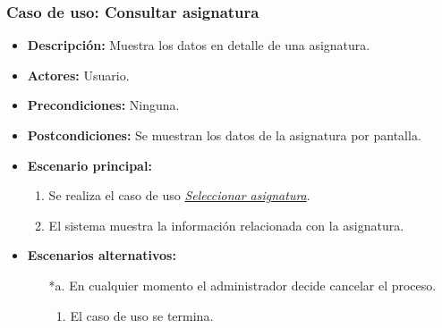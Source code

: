 \documentclass{book}
\begin{document}
\subsubsection*{Caso de uso: Consultar asignatura}
\begin{itemize}
\item{\bf Descripción:} Muestra los datos en detalle de una asignatura.
\item{\bf Actores:} Usuario.
\item{\bf Precondiciones:} Ninguna.
\item{\bf Postcondiciones:} Se muestran los datos de la asignatura por pantalla.
\item{\bf Escenario principal:} 
	\begin{enumerate}
	\item Se realiza el caso de uso {\em \hyperref[select_asignatura]{Seleccionar asignatura}}.
	\item El sistema muestra la información relacionada con la asignatura.
	\end{enumerate}
\item{\bf Escenarios alternativos:}
	\begin{itemize}
	\item[*a.] En cualquier momento el administrador decide cancelar el proceso.
		\begin{enumerate}
		\item El caso de uso se termina.
		\end{enumerate}
	\end{itemize}
\end{itemize}
\end{document}
